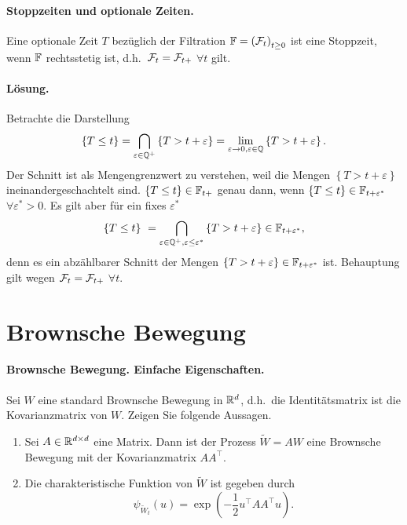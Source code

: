 \paragraph{Stoppzeiten und optionale Zeiten. } Eine optionale Zeit $T$ bezüglich
der Filtration $\mathbb F=\left( \mathcal F_t \right)_{t \geq 0}$ ist eine Stoppzeit, wenn 
$\mathbb F$ rechtsstetig ist, d.h.\ $\mathcal F_t=\mathcal F_{t+}$ $\forall t$ gilt.

\paragraph*{Lösung.}  Betrachte die Darstellung
\begin{eqnarray}
    \left\{ T \leq t \right\} = \bigcap_{\varepsilon\in\mathbb Q^{+}} \left\{ T > t+\varepsilon \right\}
    = \lim_{\varepsilon\to 0, \varepsilon\in\mathbb Q} \left\{ T > t+\varepsilon \right\}.
\end{eqnarray}
Der Schnitt ist als Mengengrenzwert zu verstehen, weil die Mengen $\left\{ T >
t+\varepsilon \right\}$ ineinandergeschachtelt sind. $\left\{ T \leq t \right\}\in \mathbb F_{t+}$
genau dann, wenn $\left\{ T \leq t \right\}\in \mathbb F_{t+\varepsilon^{*}}$ $\forall \varepsilon^{*}>0$.
Es gilt aber für ein fixes $\varepsilon^{*}$
\begin{equation}
    \left\{ T \leq t \right\}\ = 
    \bigcap_{\varepsilon\in\mathbb Q^{+}, \varepsilon\leq \varepsilon^{*}} \left\{ T > t+\varepsilon \right\} 
    \in\mathbb F_{t+\varepsilon^{*}},
\end{equation}
denn es ein abzählbarer Schnitt der Mengen $\left\{ T> t+\varepsilon
\right\}\in\mathbb F_{t+\varepsilon^{*}}$ ist. Behauptung gilt wegen $\mathcal F_t=\mathcal F_{t+}$ $\forall t$.


\section{Brownsche Bewegung}

\paragraph{Brownsche Bewegung. Einfache Eigenschaften.}
Sei $W$ eine standard Brownsche Bewegung in $\mathbb R^d$, d.h.\ die Identitätsmatrix
ist die Kovarianzmatrix von $W$. Zeigen Sie folgende Aussagen. 
\begin{enumerate}
    \item Sei $A\in \mathbb R^{d \times d}$ eine Matrix. Dann ist der Prozess $\tilde W = AW$ eine
        Brownsche Bewegung mit der Kovarianzmatrix $A A^{\top}$. 
    \item Die charakteristische Funktion von $\tilde W$ ist gegeben durch
        \begin{equation*}
            \psi_{\tilde W_t} (u) = \exp \left( -\frac{1}{2} u^{\top} A A^{\top} u \right).
        \end{equation*}
\end{enumerate}

